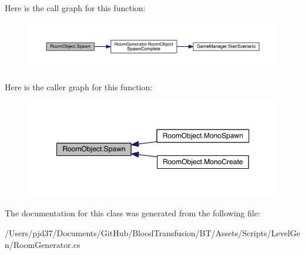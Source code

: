 Here is the call graph for this function\+:\nopagebreak
\begin{figure}[H]
\begin{center}
\leavevmode
\includegraphics[width=350pt]{class_room_object_a8a73cee299af481c4cd70501843e6005_cgraph}
\end{center}
\end{figure}




Here is the caller graph for this function\+:\nopagebreak
\begin{figure}[H]
\begin{center}
\leavevmode
\includegraphics[width=350pt]{class_room_object_a8a73cee299af481c4cd70501843e6005_icgraph}
\end{center}
\end{figure}




The documentation for this class was generated from the following file\+:\begin{DoxyCompactItemize}
\item 
/\+Users/pjd37/\+Documents/\+Git\+Hub/\+Blood\+Transfusion/\+B\+T/\+Assets/\+Scripts/\+Level\+Gen/Room\+Generator.\+cs\end{DoxyCompactItemize}
